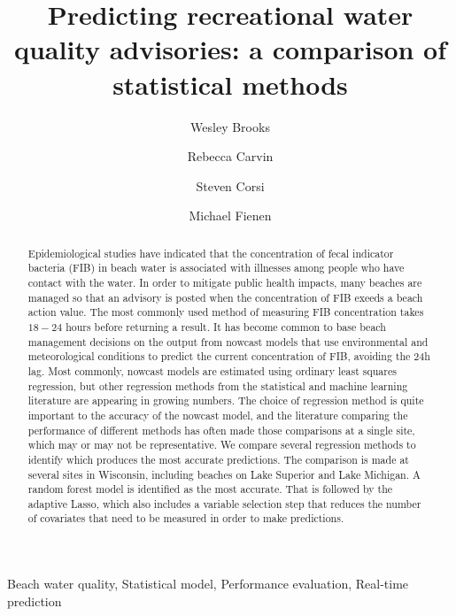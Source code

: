 \documentclass[authoryear,review, 12pt]{elsarticle}
\date{}
\begin{document}
\begin{frontmatter}

\title{Predicting recreational water quality advisories: a comparison of statistical methods}

\author[usgs-wiwsc]{Wesley Brooks}

\author[usgs-wiwsc]{Rebecca Carvin}

\author[usgs-wiwsc]{Steven Corsi}

\author[usgs-wiwsc]{Michael Fienen}

\address[usgs-wiwsc]{Wisconsin Water Science Center, United States Geological Survey, 8505 Research Way, Middleton, WI 53562}

\begin{abstract}
Epidemiological studies have indicated that the concentration of fecal indicator bacteria (FIB) in beach water is associated with illnesses among people who have contact with the water. In order to mitigate public health impacts, many beaches are managed so that an advisory is posted when the concentration of FIB exeeds a beach action value. The most commonly used method of measuring FIB concentration takes $18 - 24$ hours before returning a result. It has become common to base beach management decisions on the output from nowcast models that use environmental and meteorological conditions to predict the current concentration of FIB, avoiding the 24h lag. Most commonly, nowcast models are estimated using ordinary least squares regression, but other regression methods from the statistical and machine learning literature are appearing in growing numbers. The choice of regression method is quite important to the accuracy of the nowcast model, and the literature comparing the performance of different methods has often made those comparisons at a single site, which may or may not be representative. We compare several regression methods to identify which produces the most accurate predictions. The comparison is made at several sites in Wisconsin, including beaches on Lake Superior and Lake Michigan. A random forest model is identified as the most accurate. That is followed by the adaptive Lasso, which also includes a variable selection step that reduces the number of covariates that need to be measured in order to make predictions.
\end{abstract}

\begin{keyword}
Beach water quality, Statistical model, Performance evaluation, Real-time prediction
\end{keyword}

\end{frontmatter}
\end{document}
